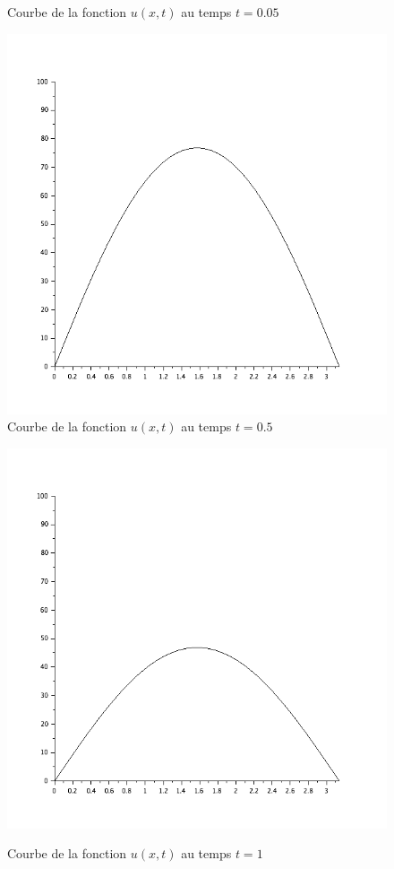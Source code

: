 \documentclass[a4paper,12pt]{report}
\begin{document}
\begin{figure}[h!]
\begin{minipage}[b]{0.48\linewidth}
	  \caption{Courbe  de la fonction $u(x,t)$ au temps $t=0.05$}
   \end{minipage}
   \begin{minipage}[b]{0.40\linewidth}
      \includegraphics[scale=0.3]{ex5_fig4.png}\\
	  \caption{Courbe  de la fonction $u(x,t)$ au temps $t=0.5$}
   \end{minipage}\hfill
   \begin{minipage}[b]{0.48\linewidth}   
      \includegraphics[scale=0.3]{ex5_fig5.png}\\
	  \caption{Courbe  de la fonction $u(x,t)$ au temps $t=1$}
   \end{minipage}
\end{figure}
\end{document}
